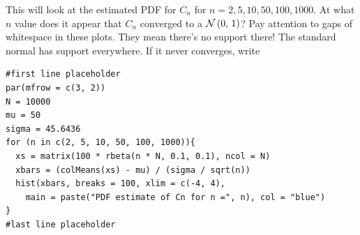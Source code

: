 \documentclass[12pt]{article}
\begin{document}
\begin{enumerate}
{This will look at the estimated PDF for $C_n$ for $n = 2, 5, 10, 50, 100, 1000$. At what $n$ value does it appear that $C_n$ converged to a $\mathcal{N}\left(0,\,1\right)$? Pay attention to gaps of whitespace in these plots. They mean there's no support there! The standard normal has support everywhere. If it never converges, write  }

\begin{verbatim}
#first line placeholder
par(mfrow = c(3, 2))
N = 10000
mu = 50
sigma = 45.6436
for (n in c(2, 5, 10, 50, 100, 1000)){
  xs = matrix(100 * rbeta(n * N, 0.1, 0.1), ncol = N)
  xbars = (colMeans(xs) - mu) / (sigma / sqrt(n))
  hist(xbars, breaks = 100, xlim = c(-4, 4), 
    main = paste("PDF estimate of Cn for n =", n), col = "blue")
}
#last line placeholder
\end{verbatim}

 

\end{enumerate}

\end{document}
